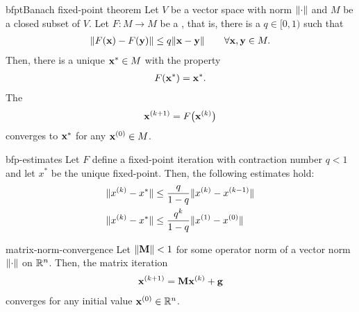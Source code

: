 \begin{Theorem*}{bfpt}{Banach fixed-point theorem}
  Let $V$ be a vector space with norm $\lVert\cdot\rVert$ and $M$ be a
  closed subset of $V$. Let $F\colon M\to M$ be a ,
  that is, there is a  $q\in[0,1)$ such that
  \begin{gather}
    \lVert F(\mathbf x)-F(\mathbf y)\rVert \le q \lVert\mathbf x-\mathbf y\rVert\qquad\forall \mathbf x,\mathbf y\in M.
  \end{gather}
  Then, there is a unique  $\mathbf x^*\in M$ with the property
  \begin{gather}
    F(\mathbf x^*) = \mathbf x^*.
  \end{gather}
  The 
  \begin{gather}
    \mathbf x^{(k+1)} = F\bigl(\mathbf x^{(k)}\bigr)
  \end{gather}
  converges to $\mathbf x^*$ for any $\mathbf x^{(0)}\in M$.
\end{Theorem*}

\begin{Corollary}{bfp-estimates}
  Let $F$ define a fixed-point iteration with contraction number $q<1$
  and let $x^*$ be the unique fixed-point. Then, the following
  estimates hold:
  \begin{align}
    \lVert x^{(k)} - x^*\rVert &\le \frac{q}{1-q} \lVert x^{(k)}-x^{(k-1)}\rVert\\
    \lVert x^{(k)} - x^*\rVert &\le \frac{q^k}{1-q} \lVert x^{(1)}-x^{(0)}\rVert
  \end{align}
\end{Corollary}  

\begin{Corollary}{matrix-norm-convergence}
  Let $\lVert\mathbf M\rVert < 1$ for some operator norm of a vector norm $\lVert\cdot\rVert$ on $\mathbb R^n$. Then, the matrix iteration
  \begin{gather}
    \mathbf x^{(k+1)} = \mathbf M \mathbf x^{(k)} + \mathbf g
  \end{gather}
  converges for any initial value $\mathbf x^{(0)}\in\mathbb R^n$.
\end{Corollary}

